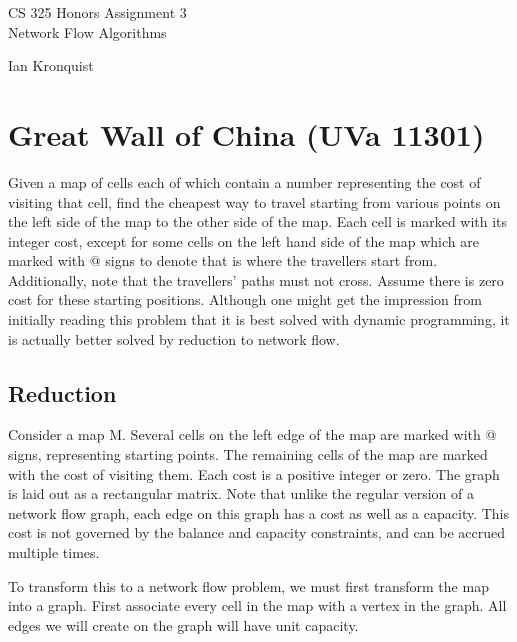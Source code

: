 \documentclass[12pt,letterpaper]{article}
\begin{document}
\begin{titlepage}
    \vspace*{4cm}
    \begin{flushright}
    {\huge
        CS 325 Honors Assignment 3\\[1cm]
    }
    {\large
        Network Flow Algorithms
    }
    \end{flushright}
    \begin{flushleft}
    \end{flushleft}
    \begin{flushright}
    Ian Kronquist
    \end{flushright}

\end{titlepage}


\section{Great Wall of China (UVa 11301)}
Given a map of cells each of which contain a number representing the cost of visiting that cell, find the cheapest way to travel starting from various points on the left side of the map to the other side of the map. Each cell is marked with its integer cost, except for some cells on the left hand side of the map which are marked with @ signs to denote that is where the travellers start from. Additionally, note that the travellers' paths must not cross. Assume there is zero cost for these starting positions. Although one might get the impression from initially reading this problem that it is best solved with dynamic programming, it is actually better solved by reduction to network flow.

\subsection{Reduction}
Consider a map M. Several cells on the left edge of the map are marked with @ signs, representing starting points. The remaining cells of the map are marked with the cost of visiting them. Each cost is a positive integer or zero. The graph is laid out as a rectangular matrix. Note that unlike the regular version of a network flow graph, each edge on this graph has a cost as well as a capacity. This cost is not governed by the balance and capacity constraints, and can be accrued multiple times.

To transform this to a network flow problem, we must first transform the map into a graph. First associate every cell in the map with a vertex in the graph. All edges we will create on the graph will have unit capacity.
\end{document}
